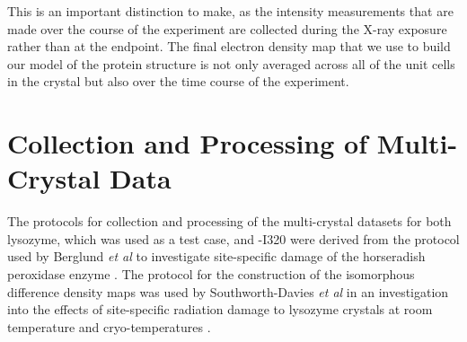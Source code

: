 
This is an important distinction to make, as the intensity measurements that are made over the course of the experiment are collected during the X-ray exposure rather than at the endpoint. The final electron density map that we use to build our model of the protein structure is not only averaged across all of the unit cells in the crystal but also over the time course of the experiment.


%		
\clearpage
\section{Collection and Processing of Multi-Crystal Data}	
The protocols for collection and processing of the multi-crystal datasets for both lysozyme, which was used as a test case, and \atpdx -I320 were derived from the protocol used by Berglund \textit{et al} to investigate site-specific damage of the horseradish peroxidase enzyme \cite{Berglund2002}. The protocol for the construction of the isomorphous difference density maps was used by Southworth-Davies \textit{et al} in an investigation into the effects of site-specific radiation damage to lysozyme crystals at room temperature and cryo-temperatures \cite{Southworth-Davies2007}.

